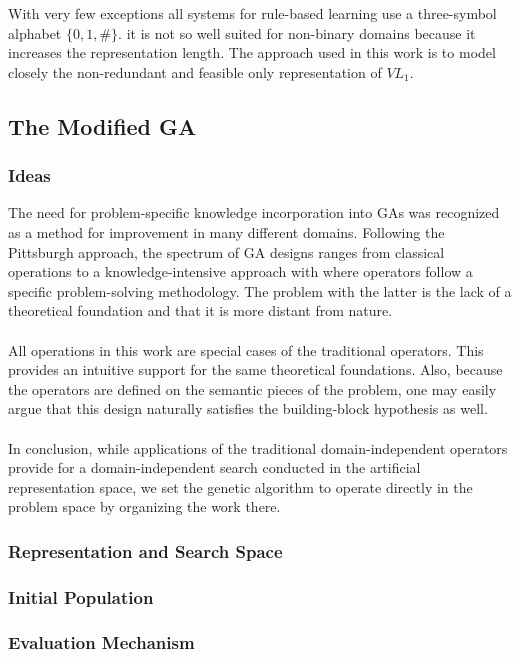 \documentclass[../main.tex]{subfiles}
\begin{document}
With very few exceptions all systems for rule-based learning use a three-symbol alphabet $\{0, 1, \#\}$. it is not so well suited for non-binary domains because it increases the representation length. The approach used in this work is to model closely the non-redundant and feasible only representation of $VL_1$.

\subsection{The Modified GA}

\subsubsection{Ideas}
The need for problem-specific knowledge incorporation into GAs was recognized as a method for improvement in many
different domains. Following the Pittsburgh approach, the spectrum of GA designs ranges from classical operations to a knowledge-intensive approach with where operators follow a specific problem-solving methodology. The problem with the latter is the lack of a theoretical foundation and that it is more distant from nature.
\\\\
All operations in this work are special cases of the traditional operators. This provides an intuitive support for the
same theoretical foundations. Also, because the operators are defined on the semantic pieces of the problem, one may
easily argue that this design naturally satisfies the building-block hypothesis as well.
\\\\
In conclusion, while applications of the traditional domain-independent operators provide for a domain-independent
search conducted in the artificial representation space, we set the genetic algorithm to operate directly in the
problem space by organizing the work there.

\subsubsection{Representation and Search Space}

\subsubsection{Initial Population}

\subsubsection{Evaluation Mechanism}
\end{document}
